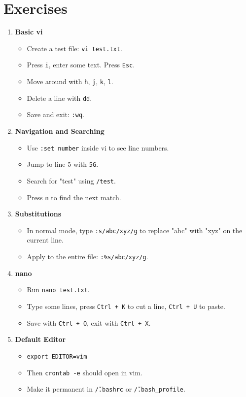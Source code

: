 \documentclass[a4paper]{report}
\begin{document}
\section*{Exercises}
\begin{enumerate}
    \item \textbf{Basic vi}
    \begin{itemize}
        \item Create a test file: \texttt{vi test.txt}.
        \item Press \texttt{i}, enter some text. Press \texttt{Esc}.
        \item Move around with \texttt{h}, \texttt{j}, \texttt{k}, \texttt{l}.
        \item Delete a line with \texttt{dd}.
        \item Save and exit: \texttt{:wq}.
    \end{itemize}
    
    \item \textbf{Navigation and Searching}
    \begin{itemize}
        \item Use \texttt{:set number} inside vi to see line numbers.
        \item Jump to line 5 with \texttt{5G}.
        \item Search for "test" using \texttt{/test}.
        \item Press \texttt{n} to find the next match.
    \end{itemize}
    
    \item \textbf{Substitutions}
    \begin{itemize}
        \item In normal mode, type \texttt{:s/abc/xyz/g} to replace "abc" with "xyz" on the current line.
        \item Apply to the entire file: \texttt{:\%s/abc/xyz/g}.
    \end{itemize}
    
    \item \textbf{nano}
    \begin{itemize}
        \item Run \texttt{nano test.txt}.
        \item Type some lines, press \texttt{Ctrl + K} to cut a line, \texttt{Ctrl + U} to paste.
        \item Save with \texttt{Ctrl + O}, exit with \texttt{Ctrl + X}.
    \end{itemize}
    
    \item \textbf{Default Editor}
    \begin{itemize}
        \item \texttt{export EDITOR=vim}
        \item Then \texttt{crontab -e} should open in vim.
        \item Make it permanent in \texttt{\~/.bashrc} or \texttt{\~/.bash\_profile}.
    \end{itemize}
\end{enumerate}
\end{document}
